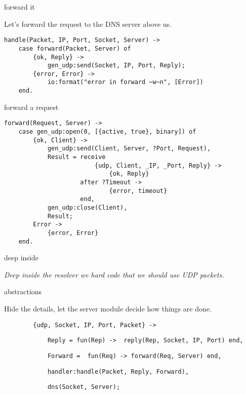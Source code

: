 \begin{frame}[fragile]{forward it}

\pause
Let's forward the request to the DNS server above us.

\pause

\begin{verbatim}
handle(Packet, IP, Port, Socket, Server) ->    
    case forward(Packet, Server) of
        {ok, Reply} ->
            gen_udp:send(Socket, IP, Port, Reply);
        {error, Error} ->
            io:format("error in forward ~w~n", [Error])
    end.
\end{verbatim}

\end{frame}

\begin{frame}[fragile]{forward a request}

\begin{verbatim}
forward(Request, Server) ->
    case gen_udp:open(0, [{active, true}, binary]) of
        {ok, Client} ->
            gen_udp:send(Client, Server, ?Port, Request),
            Result = receive 
                         {udp, Client, _IP, _Port, Reply} ->
                             {ok, Reply}
                     after ?Timeout ->
                             {error, timeout}
                     end,
            gen_udp:close(Client),
            Result;
        Error ->
            {error, Error}
    end.
\end{verbatim}

\end{frame}


\begin{frame}{deep inside}


\vspace{10pt}\pause
{\em Deep inside the resolver we hard code that we should use UDP packets.}

\end{frame}



\begin{frame}[fragile]{abstractions}

Hide the details, let the server module decide how things are done.

\vspace{10pt}\pause
 
\begin{verbatim}
        {udp, Socket, IP, Port, Packet} ->
\end{verbatim}\pause
\begin{verbatim}
            Reply = fun(Rep) ->  reply(Rep, Socket, IP, Port) end,
\end{verbatim}\pause
\begin{verbatim}
            Forward =  fun(Req) -> forward(Req, Server) end,
\end{verbatim}\pause
\begin{verbatim}
            handler:handle(Packet, Reply, Forward),
\end{verbatim}\pause
\begin{verbatim}
            dns(Socket, Server);
\end{verbatim}

\end{frame}

